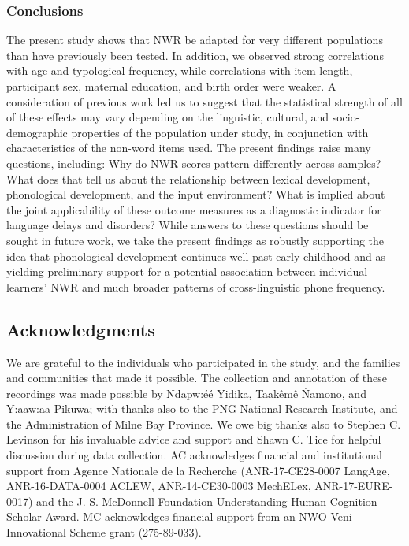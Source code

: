 \documentclass[
  american,
  ,man,floatsintext]{apa6}
\begin{document}
\hypertarget{conclusions}{%
\subsubsection{Conclusions}\label{conclusions}}

The present study shows that NWR be adapted for very different populations than have previously been tested. In addition, we observed strong correlations with age and typological frequency, while correlations with item length, participant sex, maternal education, and birth order were weaker. A consideration of previous work led us to suggest that the statistical strength of all of these effects may vary depending on the linguistic, cultural, and socio-demographic properties of the population under study, in conjunction with characteristics of the non-word items used. The present findings raise many questions, including: Why do NWR scores pattern differently across samples? What does that tell us about the relationship between lexical development, phonological development, and the input environment? What is implied about the joint applicability of these outcome measures as a diagnostic indicator for language delays and disorders? While answers to these questions should be sought in future work, we take the present findings as robustly supporting the idea that phonological development continues well past early childhood and as yielding preliminary support for a potential association between individual learners' NWR and much broader patterns of cross-linguistic phone frequency.

\newpage

\hypertarget{acknowledgments}{%
\subsection{Acknowledgments}\label{acknowledgments}}

We are grateful to the individuals who participated in the study, and the families and communities that made it possible. The collection and annotation of these recordings was made possible by Ndapw:éé Yidika, Taakêmê Ńamono, and Y:aaw:aa Pikuwa; with thanks also to the PNG National Research Institute, and the Administration of Milne Bay Province. We owe big thanks also to Stephen C. Levinson for his invaluable advice and support and Shawn C. Tice for helpful discussion during data collection. AC acknowledges financial and institutional support from Agence Nationale de la Recherche (ANR-17-CE28-0007 LangAge, ANR-16-DATA-0004 ACLEW, ANR-14-CE30-0003 MechELex, ANR-17-EURE-0017) and the J. S. McDonnell Foundation Understanding Human Cognition Scholar Award. MC acknowledges financial support from an NWO Veni Innovational Scheme grant (275-89-033).
\end{document}
